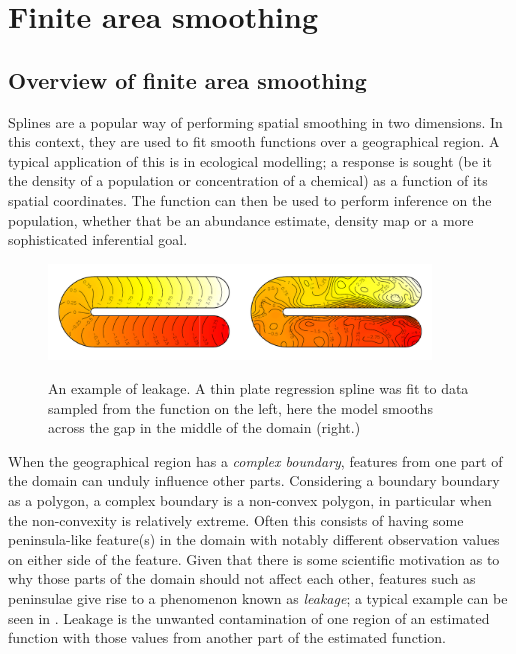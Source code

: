 	\ei
\ei

\section{Finite area smoothing}

\subsection{Overview of finite area smoothing}

Splines are a popular way of performing spatial smoothing in two dimensions. In this context, they are used to fit smooth functions over a geographical region. A typical application of this is in ecological modelling; a response is sought (be it the density of a population or concentration of a chemical) as a function of its spatial coordinates. The function can then be used to perform inference on the population, whether that be an abundance estimate, density map or a more sophisticated inferential goal.

\begin{figure}
\centering
\includegraphics[width=4in]{intro/figs/ramsay-leak.pdf}\\
\caption{An example of leakage. A thin plate regression spline was fit to data sampled from the function on the left, here the model smooths across the gap in the middle of the domain (right.)}
\label{leakage}
\end{figure}

When the geographical region has a \emph{complex boundary}, features from one part of the domain can unduly influence other parts. Considering a boundary boundary as a polygon, a complex boundary is a non-convex polygon, in particular when the non-convexity is relatively extreme. Often this consists of having some peninsula-like feature(s) in the domain with notably different observation values on either side of the feature. Given that there is some scientific motivation as to why those parts of the domain should not affect each other, features such as peninsulae give rise to a phenomenon known as \emph{leakage}; a typical example can be seen in . Leakage is the unwanted contamination of one region of an estimated function with those values from another part of the estimated function.

